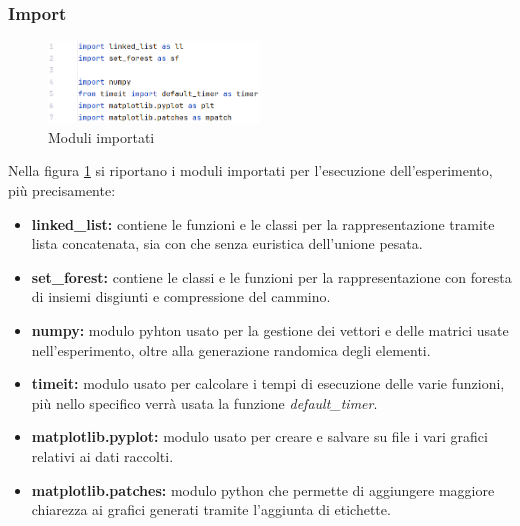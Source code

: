\documentclass[12pt]{article}
\begin{document}
\subsubsection{Import}
\begin{figure}[h]
    \centering
    \includegraphics[width=0.5\textwidth]{images/main_code_images/import.png}
    \caption{Moduli importati}
    \label{fig:import}
\end{figure}
Nella figura \ref{fig:import} si riportano i moduli importati per l'esecuzione dell'esperimento, più precisamente:
\begin{itemize}
    \item \textbf{linked\_list:} contiene le funzioni e le classi per la rappresentazione tramite lista concatenata, sia con che senza euristica dell'unione pesata.
    \item \textbf{set\_forest:} contiene le classi e le funzioni per la rappresentazione con foresta di insiemi disgiunti e compressione del cammino.
    \item \textbf{numpy:} modulo pyhton usato per la gestione dei vettori e delle matrici usate nell'esperimento, oltre alla generazione randomica degli elementi.
    \item \textbf{timeit:} modulo usato per calcolare i tempi di esecuzione delle varie funzioni, più nello specifico verrà usata la funzione \textit{default\_timer}.
    \item \textbf{matplotlib.pyplot:} modulo usato per creare e salvare su file i vari grafici relativi ai dati raccolti.
    \item \textbf{matplotlib.patches:} modulo python che permette di aggiungere maggiore chiarezza ai grafici generati tramite l'aggiunta di etichette.
\end{itemize}
\end{document}
